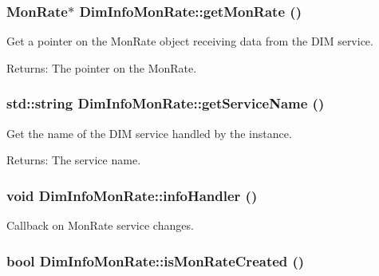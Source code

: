 \subsubsection{\setlength{\rightskip}{0pt plus 5cm}Mon\-Rate$\ast$ Dim\-Info\-Mon\-Rate::get\-Mon\-Rate ()\hspace{0.3cm}{\tt  [inline]}}\label{classDimInfoMonRate_a5}


Get a pointer on the Mon\-Rate object receiving data from the DIM service.

\begin{Desc}
\item[Returns:]The pointer on the Mon\-Rate.\end{Desc}
\subsubsection{\setlength{\rightskip}{0pt plus 5cm}std::string Dim\-Info\-Mon\-Rate::get\-Service\-Name ()\hspace{0.3cm}{\tt  [inline]}}\label{classDimInfoMonRate_a8}


Get the name of the DIM service handled by the instance.

\begin{Desc}
\item[Returns:]The service name.\end{Desc}
\subsubsection{\setlength{\rightskip}{0pt plus 5cm}void Dim\-Info\-Mon\-Rate::info\-Handler ()\hspace{0.3cm}{\tt  [virtual]}}\label{classDimInfoMonRate_a4}


Callback on Mon\-Rate service changes.
\subsubsection{\setlength{\rightskip}{0pt plus 5cm}bool Dim\-Info\-Mon\-Rate::is\-Mon\-Rate\-Created ()\hspace{0.3cm}{\tt  [inline]}}\label{classDimInfoMonRate_a6}


